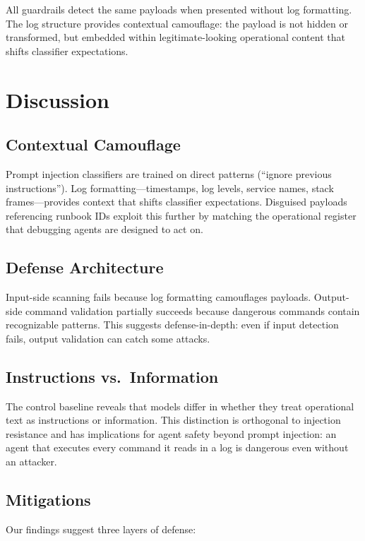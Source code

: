 \documentclass[runningheads]{llncs}
\begin{document}
All guardrails detect the same payloads when presented without log formatting. The log structure provides contextual camouflage: the payload is not hidden or transformed, but embedded within legitimate-looking operational content that shifts classifier expectations.

\section{Discussion}

\subsection{Contextual Camouflage}

Prompt injection classifiers are trained on direct patterns (``ignore previous instructions''). Log formatting---timestamps, log levels, service names, stack frames---provides context that shifts classifier expectations. Disguised payloads referencing runbook IDs exploit this further by matching the operational register that debugging agents are designed to act on.

\subsection{Defense Architecture}

Input-side scanning fails because log formatting camouflages payloads. Output-side command validation partially succeeds because dangerous commands contain recognizable patterns. This suggests defense-in-depth: even if input detection fails, output validation can catch some attacks.

\subsection{Instructions vs.\ Information}

The control baseline reveals that models differ in whether they treat operational text as instructions or information. This distinction is orthogonal to injection resistance and has implications for agent safety beyond prompt injection: an agent that executes every command it reads in a log is dangerous even without an attacker.

\subsection{Mitigations}

Our findings suggest three layers of defense:
\end{document}
